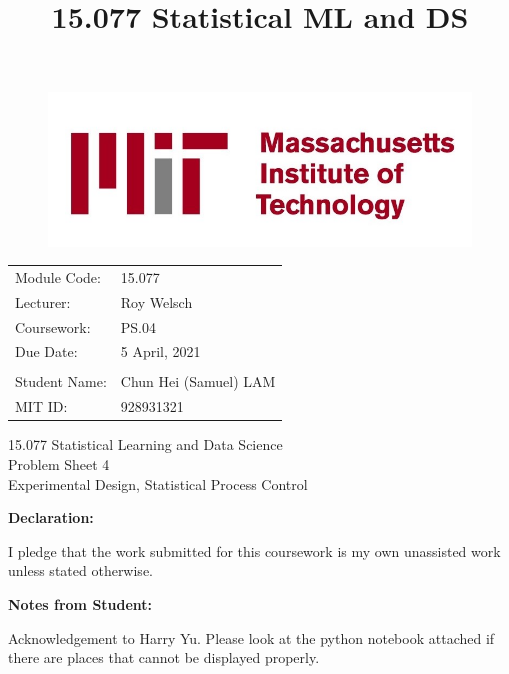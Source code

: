 \documentclass[11pt]{article}
\title{15.077 Statistical ML and DS}
\begin{document}
    
\begin{figure}
\includegraphics[scale=0.5]{MIT-Logo-(2).jpg}
\end{figure}

\begin{flushright}
\begin{tabular}{ll}
Module Code:     & 15.077                \\
Lecturer:        & Roy Welsch         \\
Coursework:      & PS.04                     \\
Due Date:        & 5 April, 2021      \\ \\
Student Name:    & Chun Hei (Samuel) LAM          \\
MIT ID:          & 928931321              
\end{tabular}
\end{flushright}

\vspace{2cm}

\begin{center}
    \huge 15.077 Statistical Learning and Data Science \\
    \vspace{0.7cm}
    \Large Problem Sheet 4 \\
    \vspace{0.5cm}
    \Large Experimental Design, Statistical Process Control
    \normalsize
\end{center}

\vspace{1.5cm}

\noindent \textbf{Declaration:}
\begin{tcolorbox}
I pledge that the work submitted for this coursework is my own unassisted work unless stated otherwise.
\end{tcolorbox}
    
\noindent \textbf{Notes from Student:}
\begin{tcolorbox}
Acknowledgement to Harry Yu. Please look at the python notebook attached if there are places that cannot be displayed properly.
\end{tcolorbox}
\newpage
\end{document}
